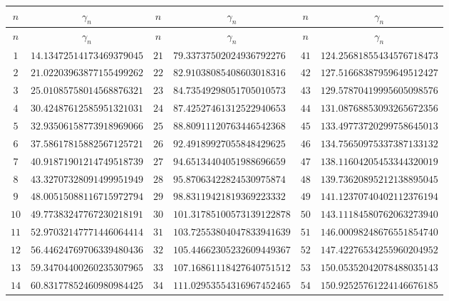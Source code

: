 \documentclass[12pt,reqno]{amsart}
\theoremstyle{plain}
\theoremstyle{definition}
\theoremstyle{remark}
\begin{document}
\renewcommand{\arraystretch}{1.05}\footnotesize
\setlength{\LTleft}{\fill}
\setlength{\LTright}{\fill}
\begin{longtable}{cl|cl|cl}
\toprule
$n$ & \multicolumn{1}{c}{$\gamma_n$} &
$n$ & \multicolumn{1}{c}{$\gamma_n$} &
$n$ & \multicolumn{1}{c}{$\gamma_n$} \\
\midrule
\endfirsthead
\toprule
$n$ & \multicolumn{1}{c}{$\gamma_n$} &
$n$ & \multicolumn{1}{c}{$\gamma_n$} &
$n$ & \multicolumn{1}{c}{$\gamma_n$} \\
\midrule
\endhead
\bottomrule
\endlastfoot
$1$ & $14.13472514173469379045$ & $21$ & $79.33737502024936792276$ & $41$ & $124.25681855434576718473$ \\
$2$ & $21.02203963877155499262$ & $22$ & $82.91038085408603018316$ & $42$ & $127.51668387959649512427$ \\
$3$ & $25.01085758014568876321$ & $23$ & $84.73549298051705010573$ & $43$ & $129.57870419995605098576$ \\
$4$ & $30.42487612585951321031$ & $24$ & $87.42527461312522940653$ & $44$ & $131.08768853093265672356$ \\
$5$ & $32.93506158773918969066$ & $25$ & $88.80911120763446542368$ & $45$ & $133.49773720299758645013$ \\
$6$ & $37.58617815882567125721$ & $26$ & $92.49189927055848429625$ & $46$ & $134.75650975337387133132$ \\
$7$ & $40.91871901214749518739$ & $27$ & $94.65134404051988696659$ & $47$ & $138.11604205453344320019$ \\
$8$ & $43.32707328091499951949$ & $28$ & $95.87063422824530975874$ & $48$ & $139.73620895212138895045$ \\
$9$ & $48.00515088116715972794$ & $29$ & $98.83119421819369223332$ & $49$ & $141.12370740402112376194$ \\
$10$ & $49.77383247767230218191$ & $30$ & $101.31785100573139122878$ & $50$ & $143.11184580762063273940$ \\
$11$ & $52.97032147771446064414$ & $31$ & $103.72553804047833941639$ & $51$ & $146.00098248676551854740$ \\
$12$ & $56.44624769706339480436$ & $32$ & $105.44662305232609449367$ & $52$ & $147.42276534255960204952$ \\
$13$ & $59.34704400260235307965$ & $33$ & $107.16861118427640751512$ & $53$ & $150.05352042078488035143$ \\
$14$ & $60.83177852460980984425$ & $34$ & $111.02953554316967452465$ & $54$ & $150.92525761224146676185$ \\

\end{longtable}
\end{document}
